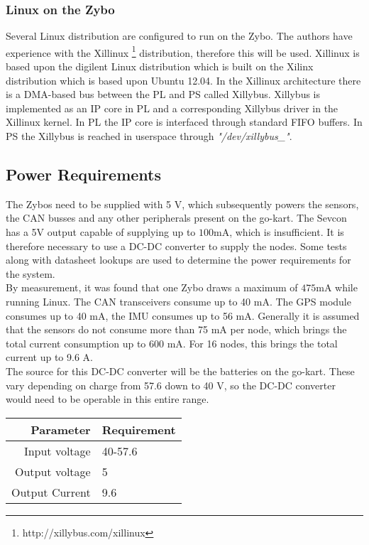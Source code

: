 \subsubsection{Linux on the Zybo}
Several Linux distribution are configured to run on the Zybo. 
The authors have experience with the Xillinux \footnote{http://xillybus.com/xillinux} distribution, therefore this will be used.
Xillinux is based upon the digilent Linux distribution which is built on the Xilinx distribution which is based upon Ubuntu 12.04.
In the Xillinux architecture there is a DMA-based bus between the PL and PS called Xillybus.
Xillybus is implemented as an IP core in PL and a corresponding Xillybus driver in the Xillinux kernel.
In PL the IP core is interfaced through standard FIFO buffers.
In PS the Xillybus is reached in userspace through \textit{"/dev/xillybus\_<bus-name>"}.

\subsection{Power Requirements}\label{sec:power_requirements}
The Zybos need to be supplied with 5 V, which subsequently powers the sensors, the CAN busses and any other peripherals present on the go-kart.
The Sevcon has a 5V output capable of supplying up to $\si{100 \milli \ampere}$, which is insufficient.
It is therefore necessary to use a DC-DC converter to supply the nodes.
Some tests along with datasheet lookups are used to determine the power requirements for the system.\\

By measurement, it was found that one Zybo draws a maximum of $\si{475 \milli \ampere}$ while running Linux.
The CAN transceivers consume up to 40 mA\cite{3.3V_CAN}. 
The GPS module consumes up to 40 mA, the IMU consumes up to 56 mA. 
Generally it is assumed that the sensors do not consume more than 75 mA per node, which brings the total current consumption up to 600 mA.
For 16 nodes, this brings the total current up to 9.6 A.\\

The source for this DC-DC converter will be the batteries on the go-kart. 
These vary depending on charge from 57.6 down to 40 V, so the DC-DC converter would need to be operable in this entire range.


\begin{table}[H]
	\centering
	\begin{tabular}{r|l}
		Parameter & Requirement  \\
		\hline
		Input voltage & 40-57.6\\
		Output voltage & 5 \\
		Output Current & 9.6
	\end{tabular}
\end{table}


